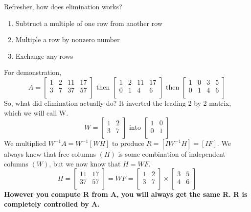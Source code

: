 Refresher, how does elimination works?
\begin{enumerate}
    \item Subtruct a multiple of one row from another row
    \item Multiple a row by nonzero number
    \item Exchange any rows
\end{enumerate}
For demonstration,
\[
    A =
    \begin{bmatrix}
        1 & 2 & 11 & 17  \\
        3 & 7 & 37 & 57  \\
    \end{bmatrix}
    \text{ then }
    \begin{bmatrix}
        1 & 2 & 11 & 17  \\
        0 & 1 & 4 & 6  \\
    \end{bmatrix}
    \text{ then }
    \begin{bmatrix}
        1 & 0 & 3 & 5  \\
        0 & 1 & 4 & 6  \\
    \end{bmatrix}
\]
So, what did elimination actually do? It inverted the leading 2 by 2 matrix, which we will call W.
\[
    W =
    \begin{bmatrix}
        1 & 2  \\
        3 & 7  \\
    \end{bmatrix}
    \text{ into }
    \begin{bmatrix}
        1 & 0  \\
        0 & 1  \\
    \end{bmatrix}
\]
We multiplied \(W^{-1}A = W^{-1}[ W H ] \text{ to produce } R =  [I W^{-1} H ] = [ I F ]  \). We always knew that free columns \((H)\) is some combination of independent columns \((W)\), but we now know that \(H = W F\).
\[
    H =
    \begin{bmatrix}
        11 & 17 \\
        37 & 57  \\
    \end{bmatrix}
    = W F =
    \begin{bmatrix}
        1 & 2  \\
        3 & 7  \\
    \end{bmatrix}
    \times
    \begin{bmatrix}
        3 & 5  \\
        4 & 6  \\
    \end{bmatrix}
\]
\textbf{However you compute R from A, you will always get the same R. R is completely controlled by A.}

